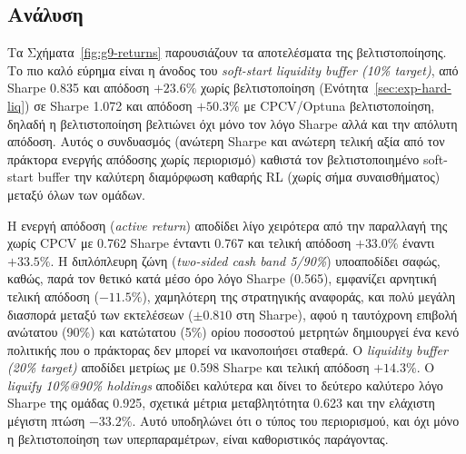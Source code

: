 \subsection{Ανάλυση}
\label{subsec:exp-cpcv-analysis}

Τα Σχήματα~\ref{fig:g9-returns} παρουσιάζουν τα αποτελέσματα της βελτιστοποίησης. 
Το πιο καλό εύρημα είναι η άνοδος του \textit{soft-start liquidity buffer (10\% target)}, από Sharpe 0.835 και απόδοση $+23{.}6\%$ 
χωρίς βελτιστοποίηση (Ενότητα~\ref{sec:exp-hard-liq}) σε Sharpe 1.072 και απόδοση $+50{.}3\%$ με CPCV/Optuna 
βελτιστοποίηση, δηλαδή η βελτιστοποίηση βελτιώνει όχι μόνο τον λόγο Sharpe αλλά και την απόλυτη απόδοση. 
Αυτός ο συνδυασμός (ανώτερη Sharpe και ανώτερη τελική αξία από τον πράκτορα ενεργής απόδοσης χωρίς περιορισμό) 
καθιστά τον βελτιστοποιημένο soft-start buffer την καλύτερη διαμόρφωση καθαρής RL (χωρίς σήμα συναισθήματος) μεταξύ όλων των ομάδων.

Η ενεργή απόδοση (\textit{active return}) αποδίδει λίγο χειρότερα από την παραλλαγή της χωρίς CPCV με 0.762 Sharpe ένταντι 0.767 και τελική απόδοση $+33{.}0\%$ έναντι $+33{.}5\%$. 
Η διπλόπλευρη ζώνη (\textit{two-sided cash band 5/90\%}) υποαποδίδει σαφώς, καθώς, παρά τον θετικό κατά μέσο όρο λόγο Sharpe (0.565), 
εμφανίζει αρνητική τελική απόδοση ($-11{.}5\%$), χαμηλότερη της στρατηγικής αναφοράς, και πολύ μεγάλη 
διασπορά μεταξύ των εκτελέσεων ($\pm 0{.}810$ στη Sharpe), αφού η ταυτόχρονη επιβολή ανώτατου (90\%) 
και κατώτατου (5\%) ορίου ποσοστού μετρητών δημιουργεί ένα κενό πολιτικής που ο πράκτορας δεν μπορεί να ικανοποιήσει σταθερά. 
Ο \textit{liquidity buffer (20\% target)} αποδίδει μετρίως με 0.598 Sharpe και τελική απόδοση $+14{.}3\%$. 
Ο \textit{liquify 10\%@90\% holdings} αποδίδει καλύτερα και δίνει το δεύτερο καλύτερο λόγο Sharpe της ομάδας 0.925, σχετικά μέτρια μεταβλητότητα 0.623 και την ελάχιστη μέγιστη πτώση $-33.2\%$. 
Αυτό υποδηλώνει ότι ο τύπος του περιορισμού, και όχι μόνο η βελτιστοποίηση των υπερπαραμέτρων, είναι καθοριστικός παράγοντας.





